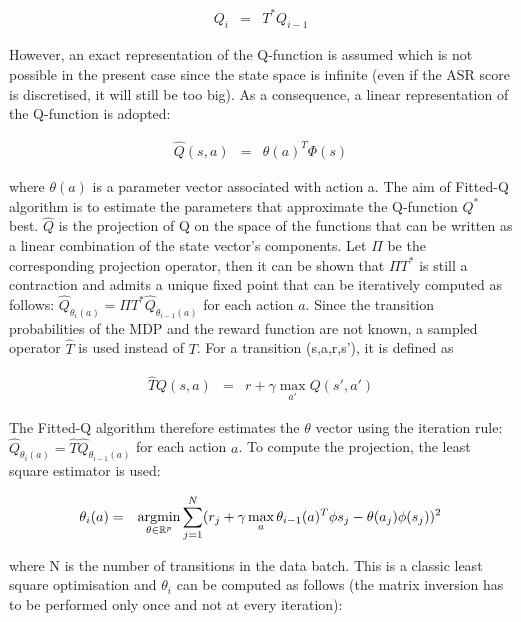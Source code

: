 			\begin{eqnarray}
				Q_i & = & T^* Q_{i-1}
			\end{eqnarray}
						
					However, an exact representation of the Q-function is assumed which is not possible in the present case since the state space is infinite (even if the ASR score is discretised, it will still be too big). As a consequence, a linear representation of the Q-function is adopted:
        
			\begin{eqnarray}
				\hat{Q}(s,a) & = & \theta(a)^T \Phi(s)
			\end{eqnarray}
            
      	where $\theta(a)$ is a parameter vector associated with action a. The aim of Fitted-Q algorithm is to estimate the parameters that approximate the Q-function $Q^*$ best. $\hat{Q}$ is the projection of Q on the space of the functions that can be written as a linear combination of the state vector's components. Let $\Pi$ be the corresponding projection operator, then it can be shown that $\Pi T^*$ is still a contraction and admits a unique fixed point that can be iteratively computed as follows: $\hat{Q}_{\theta_i (a)} = \Pi T^* \hat{Q}_{\theta_{i-1} (a)}$ for each action $a$. Since the transition probabilities of the MDP and the reward function are not known, a sampled operator $\hat{T}$ is used instead of $T$. For a transition (s,a,r,s'), it is defined as
        
				\begin{eqnarray}
					\hat{T} Q(s,a) & = & r + \gamma \max_{a'} Q(s',a')
				\end{eqnarray}
            
      	The Fitted-Q algorithm therefore estimates the $\theta$ vector using the iteration rule: $\hat{Q}_{\theta_i (a)} = \hat{T} \hat{Q}_{\theta_{i-1} (a)}$ for each action $a$. To compute the projection, the least square estimator is used:
        
				\begin{eqnarray}
					\theta_i (a) & = & \mathop{\hbox{argmin}}_{\theta \in \mathbb{R}^p} \sum_{j=1}^N (r_j + \gamma \mathop{\hbox{max}}_a \theta_{i-1}(a)^T \phi{s_j} - \theta (a_j) \phi(s_j))^2
				\end{eqnarray}
            
      	where N is the number of transitions in the data batch. This is a classic least square optimisation and $\theta_i$ can be computed as follows (the matrix inversion has to be performed only once and not at every iteration):
        
